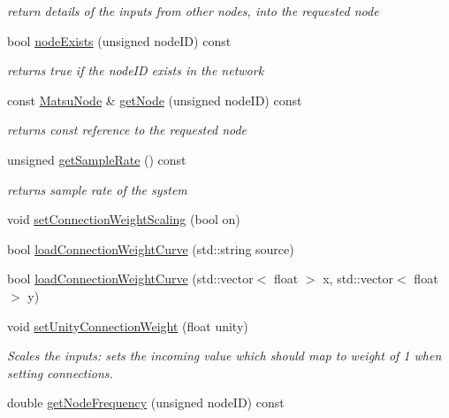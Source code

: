 \begin{DoxyCompactItemize}
\begin{DoxyCompactList}\small\item\em return details of the inputs from other nodes, into the requested node \end{DoxyCompactList}\item 
bool \mbox{\hyperlink{classMatsuokaEngine_aac87afef0c7c99601fa77e2be27b2b74}{node\+Exists}} (unsigned node\+ID) const
\begin{DoxyCompactList}\small\item\em returns true if the node\+ID exists in the network \end{DoxyCompactList}\item 
const \mbox{\hyperlink{classMatsuNode}{Matsu\+Node}} \& \mbox{\hyperlink{classMatsuokaEngine_ae2d2de39e55b20e6c579039eb6081246}{get\+Node}} (unsigned node\+ID) const
\begin{DoxyCompactList}\small\item\em returns const reference to the requested node \end{DoxyCompactList}\item 
unsigned \mbox{\hyperlink{classMatsuokaEngine_a2757e406e811cbe2e28f8b661cf29472}{get\+Sample\+Rate}} () const
\begin{DoxyCompactList}\small\item\em returns sample rate of the system \end{DoxyCompactList}\item 
void \mbox{\hyperlink{classMatsuokaEngine_adb864bf26563682f94ba2e131fb8b793}{set\+Connection\+Weight\+Scaling}} (bool on)
\item 
bool \mbox{\hyperlink{classMatsuokaEngine_ae2ad27d38196e2217bdb0b5da35fd095}{load\+Connection\+Weight\+Curve}} (std\+::string source)
\item 
bool \mbox{\hyperlink{classMatsuokaEngine_ad05eb51876bee90334426757a981139b}{load\+Connection\+Weight\+Curve}} (std\+::vector$<$ float $>$ x, std\+::vector$<$ float $>$ y)
\item 
void \mbox{\hyperlink{classMatsuokaEngine_aa7254e0141ad5763ff6267a8430b30ab}{set\+Unity\+Connection\+Weight}} (float unity)
\begin{DoxyCompactList}\small\item\em Scales the inputs\+: sets the incoming value which should map to weight of 1 when setting connections. \end{DoxyCompactList}\item 
double \mbox{\hyperlink{classMatsuokaEngine_a88d27453816ff152b17b6e744979e994}{get\+Node\+Frequency}} (unsigned node\+ID) const

\end{DoxyCompactItemize}
